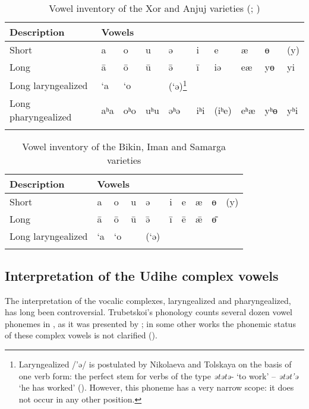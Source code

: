 \documentclass[output=paper,colorlinks,citecolor=brown]{langscibook}
\begin{document}
\begin{table}[h]
\begin{tabular}{ l l l l l l l l l l }
  \lsptoprule
Description & \multicolumn{9}{l}{Vowels}\\
  \midrule
Short &	a & o & u & ə & i & e & æ & ɵ & (y)\\
Long & ā &	ō & ū	& ə̄ & ī &	iə & eæ & yɵ & yi\\
Long laryngealized & ‘a & ‘o & & (‘ə)\footnote{Laryngealized /’ə/ is postulated by Nikolaeva and Tolskaya on the basis of one verb form: the perfect stem for verbs of the type \textit{ətətə-} ‘to work’ – \textit{ətət’ə} ‘he has worked’ (\citealt[40]{NikolaevaTolskaya2001}). However, this phoneme has a very narrow scope: it does not occur in any other position.} & & & & & \\
Long pharyngealized & aʰa & oʰo & uʰu & əʰə & iʰi & (iʰe) & eʰæ & yʰɵ & yʰi\\
  \lspbottomrule
\end{tabular}
\caption{Vowel inventory of the Xor and Anjuj varieties (\citealt[83--86]{Shneider1936}; \citealt{Simonov1988})}
\label{table:7.2}
\end{table}


\begin{table}[h]
\begin{tabular}{ l l l l l l l l l l }
  \lsptoprule
Description & \multicolumn{9}{l}{Vowels}\\
  \midrule
Short &	a & o & u & ə & i & e & æ & ɵ & (y)\\
Long & ā &	ō & ū	& ə̄ & ī &	ē & ǣ & ɵ̄ & \\
Long laryngealized & ‘a & ‘o & & (‘ə) & & & & & \\
  \lspbottomrule
\end{tabular}
\caption{Vowel inventory of the Bikin, Iman and Samarga varieties}
\label{table:7.3}
\end{table}

\subsection{Interpretation of the Udihe complex vowels}

The interpretation of the  vocalic complexes, laryngealized and pharyngealized, has long been controversial. Trubetskoi’s phonology counts several dozen vowel phonemes in , as it was presented by \citet{Shneider1936}; in some other works the phonemic status of these complex vowels is not clarified (\citealt{Nikolaeva2000}).
\end{document}
